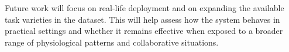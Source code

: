 \documentclass{llncs}
\begin{document}
Future work will focus on real-life deployment and on expanding the available task varieties in the dataset. This will help assess how the system behaves in practical settings and whether it remains effective when exposed to a broader range of physiological patterns and collaborative situations.


\newpage


\end{document}
